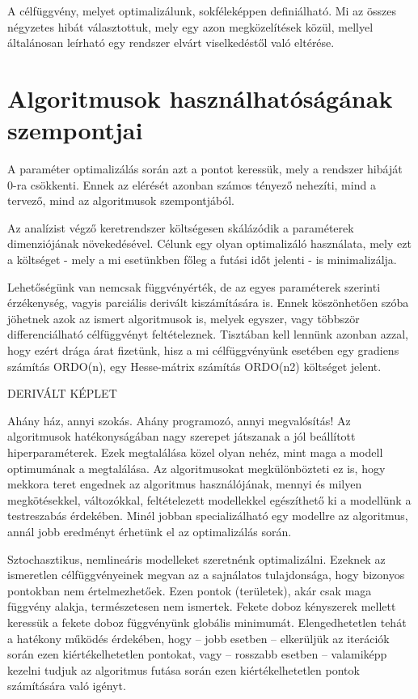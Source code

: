 A célfüggvény, melyet optimalizálunk, sokféleképpen definiálható. Mi az összes négyzetes hibát választottuk, mely egy azon megközelítések közül, mellyel általánosan leírható egy rendszer elvárt viselkedéstől való eltérése.

\section{Algoritmusok használhatóságának szempontjai}

A paraméter optimalizálás során azt a pontot keressük, mely a rendszer hibáját 0-ra csökkenti. Ennek az elérését azonban számos tényező nehezíti, mind a tervező, mind az algoritmusok szempontjából.

Az analízist végző keretrendszer költségesen skálázódik a paraméterek dimenziójának növekedésével. Célunk egy olyan optimalizáló használata, mely ezt a költséget - mely a mi esetünkben főleg a futási időt jelenti - is minimalizálja.

Lehetőségünk van nemcsak függvényérték, de az egyes paraméterek szerinti érzékenység, vagyis parciális derivált kiszámítására is. Ennek köszönhetően szóba jöhetnek azok az ismert algoritmusok is, melyek egyszer, vagy többször differenciálható célfüggvényt feltételeznek. Tisztában kell lennünk azonban azzal, hogy ezért drága árat fizetünk, hisz a mi célfüggvényünk esetében egy gradiens számítás %
ORDO(n), egy Hesse-mátrix számítás ORDO(n2) költséget jelent.

DERIVÁLT KÉPLET %

Ahány ház, annyi szokás. Ahány programozó, annyi megvalósítás! Az algoritmusok hatékonyságában nagy szerepet játszanak a jól beállított hiperparaméterek. Ezek megtalálása közel olyan nehéz, mint maga a modell optimumának a megtalálása. Az algoritmusokat megkülönbözteti ez is, hogy mekkora teret engednek az algoritmus használójának, mennyi és milyen megkötésekkel, változókkal, feltételezett modellekkel egészíthető ki a modellünk a testreszabás érdekében. Minél jobban specializálható egy modellre az algoritmus, annál jobb eredményt érhetünk el az optimalizálás során.

Sztochasztikus, nemlineáris modelleket szeretnénk optimalizálni. Ezeknek az ismeretlen célfüggvényeinek megvan az a sajnálatos tulajdonsága, hogy bizonyos pontokban nem értelmezhetőek. Ezen pontok (területek), akár csak maga függvény alakja, természetesen nem ismertek. Fekete doboz kényszerek mellett keressük a fekete doboz függvényünk globális minimumát. %
Elengedhetetlen tehát a hatékony működés érdekében, hogy -- jobb esetben -- elkerüljük az iterációk során ezen kiértékelhetetlen pontokat, vagy -- rosszabb esetben -- valamiképp kezelni tudjuk az algoritmus futása során ezen kiértékelhetetlen pontok számítására való igényt.

